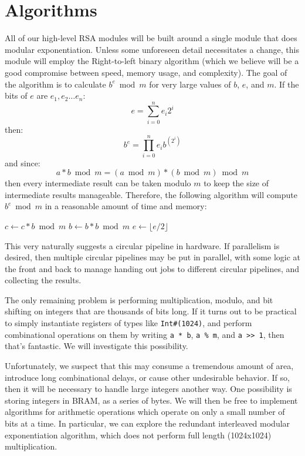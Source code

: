 \documentclass[12pt]{article}
\begin{document}
\section{Algorithms}
All of our high-level RSA modules will be built around a single module that does modular exponentiation.
Unless some unforeseen detail necessitates a change, this module will employ the Right-to-left binary algorithm
(which we believe will be a good compromise between speed, memory usage, and complexity).
The goal of the algorithm is to calculate $b^e \bmod m$ for very large values of $b$, $e$, and $m$.
If the bits of $e$ are $e_1, e_2 \dots e_n$:
\begin{equation}
e = \sum_{i = 0}^{n} e_i 2^i
\end{equation}
then:
\begin{equation}
b^e = \prod_{i = 0}^{n} e_i b^{(2^i)}
\end{equation}
and since:
\begin{equation}
a * b \bmod m = (a \bmod m) * (b \bmod m) \bmod m
\end{equation}
then every intermediate result can be taken modulo $m$ to keep the size of intermediate results manageable.
Therefore, the following algorithm will compute $b^e \bmod m$ in a reasonable amount of time and memory:
\begin{algorithmic}
		\State $c \gets c * b \bmod m$
	\EndIf
	\State $b \gets b * b \bmod m$
	\State $e \gets \lfloor e / 2 \rfloor$
\EndWhile
\end{algorithmic}
This very naturally suggests a circular pipeline in hardware.
If parallelism is desired, then multiple circular pipelines may be put in parallel,
with some logic at the front and back to manage handing out jobs to different circular pipelines,
and collecting the results.

The only remaining problem is performing multiplication, modulo, and bit shifting
on integers that are thousands of bits long.
If it turns out to be practical to simply instantiate registers of types like {\tt Int\#(1024)},
and perform combinational operations on them by writing {\tt a~*~b}, {\tt a~\%~m}, and {\tt a~>>~1},
then that's fantastic.
We will investigate this possibility.

Unfortunately, we suspect that this may consume a tremendous amount of area,
introduce long combinational delays, or cause other undesirable behavior.
If so, then it will be necessary to handle large integers another way.
One possibility is storing integers in BRAM, as a series of bytes.
We will then be free to implement algorithms for arithmetic operations
which operate on only a small number of bits at a time. In particular, we can 
explore the redundant interleaved modular exponentiation algorithm, which does
not perform full length (1024x1024) multiplication. 
\end{document}
